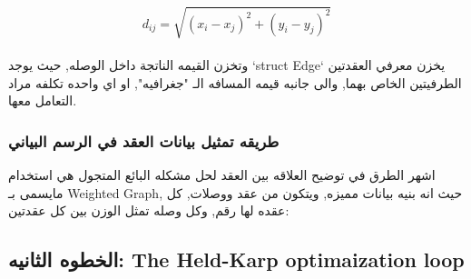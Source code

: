 \documentclass{article}
\newcommand{\en}[1]{\textenglish{#1}}
\begin{document}
{\LARGE
$$
d_{ij} = \sqrt{(x_i - x_j)^2 + (y_i - y_j)^2}
$$}\\

وتخزن القيمه الناتجة داخل الوصله, حيث يوجد \en{`struct Edge`} يخزن معرفي العقدتين الطرفيتين الخاص بهما, والى جانبه قيمه المسافه الـ "جغرافيه", او اي واحده تكلفه مراد التعامل معها.

\subsubsection{طريقه تمثيل بيانات العقد في الرسم البياني}
اشهر الطرق في توضيح العلاقه بين العقد لحل مشكله البائع المتجول هي استخدام مايسمى بـ \en{Weighted Graph}, حيث انه بنيه بيانات مميزه, ويتكون من عقد ووصلات, كل عقده لها رقم, وكل وصله تمثل الوزن بين كل عقدتين:\\

\begin{figure}[h]
	\centering
\end{figure}


\subsection{الخطوه الثانيه: \en{The Held-Karp optimaization loop}}
\end{document}
